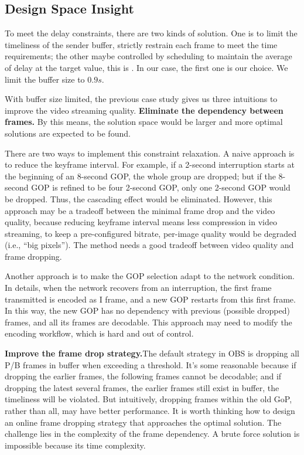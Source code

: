 \subsection{Design Space Insight}
To meet the delay constraints, there are two kinds of solution. One is to limit the timeliness of the sender buffer, strictly restrain each frame to meet the time requirements; the other maybe controlled by scheduling to maintain the average of delay at the target value, this is . In our case, the first one is our choice. We limit the buffer size to $0.9s$.

With buffer size limited, the previous case study gives us three intuitions to improve the video streaming quality.
\textbf{Eliminate the dependency between frames.}
By this means, the solution space would be larger and more optimal solutions are expected to be found.

There are two ways to implement this constraint relaxation. A naive approach is to reduce the keyframe interval. For example, if a 2-second interruption starts at the beginning of an 8-second GOP, the whole group are dropped; but if the 8-second GOP is refined to be four 2-second GOP, only one 2-second GOP would be dropped. Thus, the cascading effect would be eliminated. However, this approach may be a tradeoff between the minimal frame drop and the video quality, because reducing keyframe interval means less compression in video streaming, to keep a pre-configured bitrate, per-image quality would be degraded (i.e., ``big pixels''). The method needs a good tradeoff between video quality and frame dropping.

Another approach is to make the GOP selection adapt to the network condition. In details, when the network recovers from an interruption, the first frame transmitted is encoded as I frame, and a new GOP restarts from this first frame. In this way, the new GOP has no dependency with previous (possible dropped) frames, and all its frames are decodable. This approach may need to modify the encoding workflow, which is hard and out of control.

\textbf{Improve the frame drop strategy.}The default strategy in OBS is dropping all P/B frames in buffer when exceeding a threshold. It's some reasonable because if dropping the earlier frames, the following frames cannot be decodable; and if dropping the latest several frames, the earlier frames still exist in buffer, the timeliness will be violated. But intuitively, dropping frames within the old GoP, rather than all, may have better performance. It is worth thinking how to design an online frame dropping strategy that approaches the optimal solution. The challenge lies in the complexity of the frame dependency. A brute force solution is impossible because its time complexity.

